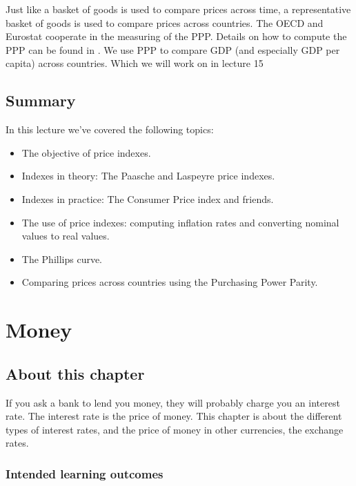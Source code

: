 \documentclass[]{book}
\providecommand{\tightlist}{%
  \setlength{\itemsep}{0pt}\setlength{\parskip}{0pt}}
\begin{document}
Just like a basket of goods is used to compare prices across time, a representative basket of goods is used to compare prices across countries. The OECD and Eurostat cooperate in the measuring of the PPP. Details on how to compute the PPP can be found in \citep{ppp}. We use PPP to compare GDP (and especially GDP per capita) across countries. Which we will work on in lecture 15

\hypertarget{summary-3}{%
\section{Summary}\label{summary-3}}

In this lecture we've covered the following topics:

\begin{itemize}
\tightlist
\item
  The objective of price indexes.
\item
  Indexes in theory: The Paasche and Laspeyre price indexes.
\item
  Indexes in practice: The Consumer Price index and friends.
\item
  The use of price indexes: computing inflation rates and converting nominal values to real values.
\item
  The Phillips curve.
\item
  Comparing prices across countries using the Purchasing Power Parity.
\end{itemize}

\hypertarget{money}{%
\chapter{Money}\label{money}}

\hypertarget{about-this-chapter-4}{%
\section{About this chapter}\label{about-this-chapter-4}}

If you ask a bank to lend you money, they will probably charge you an interest rate. The interest rate is the price of money. This chapter is about the different types of interest rates, and the price of money in other currencies, the exchange rates.

\hypertarget{intended-learning-outcomes-4}{%
\subsection{Intended learning outcomes}\label{intended-learning-outcomes-4}}
\end{document}
